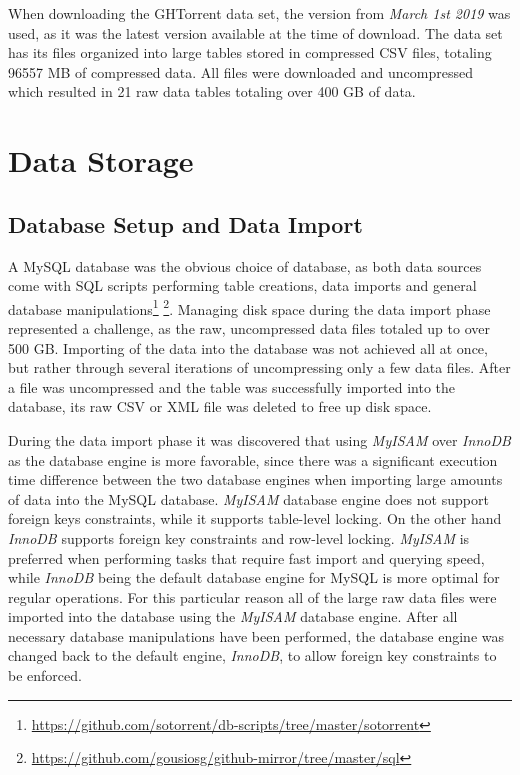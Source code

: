         When downloading the GHTorrent data set, the version from \textit{March 1st 2019} was used, as it was the latest version available at the time of download. The data set has its files organized into large tables stored in compressed CSV files, totaling 96557 MB of compressed data. All files were downloaded and uncompressed which resulted in 21 raw data tables totaling over 400 GB of data.

\section{Data Storage}

    \subsection{Database Setup and Data Import}
        
        A MySQL database was the obvious choice of database, as both data sources come with SQL scripts performing table creations, data imports and general database manipulations\footnote{\label{SO_sql} \url{https://github.com/sotorrent/db-scripts/tree/master/sotorrent}} \footnote{\label{GH_sql} \url{https://github.com/gousiosg/github-mirror/tree/master/sql}}. Managing disk space during the data import phase represented a challenge, as the raw, uncompressed data files totaled up to over 500 GB. Importing of the data into the database was not achieved all at once, but rather through several iterations of uncompressing only a few data files. After a file was uncompressed and the table was successfully imported into the database, its raw CSV or XML file was deleted to free up disk space. 
        
        During the data import phase it was discovered that using \textit{MyISAM} over \textit{InnoDB} as the database engine is more favorable, since there was a significant execution time difference between the two database engines when importing large amounts of data into the MySQL database. \textit{MyISAM} database engine does not support foreign keys constraints, while it supports table-level locking. On the other hand \textit{InnoDB} supports foreign key constraints and row-level locking. \textit{MyISAM} is preferred when performing tasks that require fast import and querying speed, while \textit{InnoDB} being the default database engine for MySQL is more optimal for regular operations. For this particular reason all of the large raw data files were imported into the database using the \textit{MyISAM} database engine. After all necessary database manipulations have been performed, the database engine was changed back to the default engine, \textit{InnoDB}, to allow foreign key constraints to be enforced. 
     
